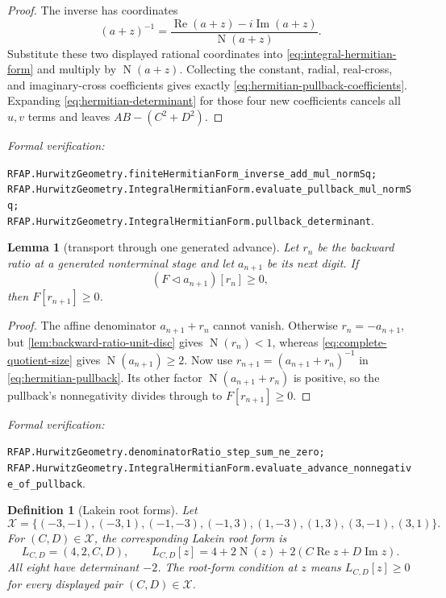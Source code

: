 \documentclass[11pt]{article}
\newtheorem{lemma}[lemma]{Lemma}
\newtheorem{definition}[definition]{Definition}
\newcommand{\Norm}[1]{\operatorname{N}\!\left(#1\right)}
\newcommand{\leanref}[1]{\par\smallskip\noindent
  \emph{Formal verification:}\par\nobreak
  {\raggedright\nolinkurl{#1}.\par}}
\begin{document}
\begin{proof}
The inverse has coordinates
\[
 (a+z)^{-1}
 =\frac{\operatorname{Re}(a+z)-i\operatorname{Im}(a+z)}{\Norm{a+z}}.
\]
Substitute these two displayed rational coordinates into
\eqref{eq:integral-hermitian-form} and multiply by $\Norm{a+z}$.  Collecting
the constant, radial, real-cross, and imaginary-cross coefficients gives
exactly \eqref{eq:hermitian-pullback-coefficients}.  Expanding
\eqref{eq:hermitian-determinant} for those four new coefficients cancels all
$u,v$ terms and leaves $AB-(C^2+D^2)$.
\end{proof}

\leanref{RFAP.HurwitzGeometry.finiteHermitianForm_inverse_add_mul_normSq;
RFAP.HurwitzGeometry.IntegralHermitianForm.evaluate_pullback_mul_normSq;
RFAP.HurwitzGeometry.IntegralHermitianForm.pullback_determinant}

\begin{lemma}[transport through one generated advance]
\label{lem:hermitian-transport}
Let $r_n$ be the backward ratio at a generated nonterminal stage and let
$a_{n+1}$ be its next digit.  If
\[
               (F\mathbin{\triangleleft}a_{n+1})[r_n]\ge0,
\]
then $F[r_{n+1}]\ge0$.
\end{lemma}

\begin{proof}
The affine denominator $a_{n+1}+r_n$ cannot vanish.  Otherwise
$r_n=-a_{n+1}$, but \cref{lem:backward-ratio-unit-disc} gives
$\Norm{r_n}<1$, whereas \eqref{eq:complete-quotient-size} gives
$\Norm{a_{n+1}}\ge2$.  Now use
$r_{n+1}=(a_{n+1}+r_n)^{-1}$ in
\eqref{eq:hermitian-pullback}.  Its other factor
$\Norm{a_{n+1}+r_n}$ is positive, so the pullback's nonnegativity divides
through to $F[r_{n+1}]\ge0$.
\end{proof}

\leanref{RFAP.HurwitzGeometry.denominatorRatio_step_sum_ne_zero;
RFAP.HurwitzGeometry.IntegralHermitianForm.evaluate_advance_nonnegative_of_pullback}

\begin{definition}[Lakein root forms]
\label{def:lakein-root-forms}
Let
\[
 \mathcal X=\{(-3,-1),(-3,1),(-1,-3),(-1,3),
                 (1,-3),(1,3),(3,-1),(3,1)\}.
\]
For $(C,D)\in\mathcal X$, the corresponding \emph{Lakein root form} is
\begin{equation}
\label{eq:lakein-root-form}
             L_{C,D}=(4,2,C,D),
 \qquad
             L_{C,D}[z]
               =4+2\Norm z+2(C\operatorname{Re}z+D\operatorname{Im}z).
\end{equation}
All eight have determinant $-2$.  The \emph{root-form condition} at $z$
means $L_{C,D}[z]\ge0$ for every displayed pair $(C,D)\in\mathcal X$.
\end{definition}
\end{document}

